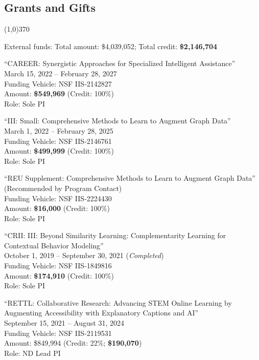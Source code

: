 \documentclass[10pt]{article}
\newenvironment{myindentpar}[1]%
{\begin{list}{}%
         {\setlength{\leftmargin}{#1}}%
         \item[]%
}
{\end{list}}
\newcounter{list}
\begin{document}
\subsection{\sc Grants and Gifts}
\vspace{-0.4cm} \line(1,0){370} \vspace{-0.1cm}

\begin{myindentpar}{0.75cm}

\hspace{-0.75cm}External funds: Total amount: \$4,039,052; Total credit: \textbf{\$2,146,704}

\hspace{-0.75cm}``CAREER: Synergistic Approaches for Specialized Intelligent Assistance'' \\
March 15, 2022 -- February 28, 2027 \\
Funding Vehicle: NSF IIS-2142827 \\
Amount: \textbf{\$549,969} (Credit: 100\%) \\
Role: {Sole PI}

\hspace{-0.75cm}``III: Small: Comprehensive Methods to Learn to Augment Graph Data'' \\
March 1, 2022 -- February 28, 2025 \\
Funding Vehicle: NSF IIS-2146761 \\
Amount: \textbf{\$499,999} (Credit: 100\%) \\
Role: {Sole PI}

\hspace{-0.75cm}``REU Supplement: Comprehensive Methods to Learn to Augment Graph Data'' \\
(Recommended by Program Contact) \\
Funding Vehicle: NSF IIS-2224430 \\
Amount: \textbf{\$16,000} (Credit: 100\%) \\
Role: {Sole PI}

\hspace{-0.75cm}``CRII: III: Beyond Similarity Learning: Complementarity Learning for Contextual Behavior Modeling'' \\
October 1, 2019 -- September 30, 2021 (\emph{Completed}) \\
Funding Vehicle: NSF IIS-1849816 \\
Amount: \textbf{\$174,910} (Credit: 100\%) \\
Role: {Sole PI}

\hspace{-0.75cm}``RETTL: Collaborative Research: Advancing STEM Online Learning by Augmenting Accessibility with Explanatory Captions and AI'' \\
September 15, 2021 -- August 31, 2024 \\
Funding Vehicle: NSF IIS-2119531 \\
Amount: \$849,994 (Credit: 22\%; \textbf{\$190,070}) \\
Role: {ND Lead PI}


\end{myindentpar}
\end{document}
